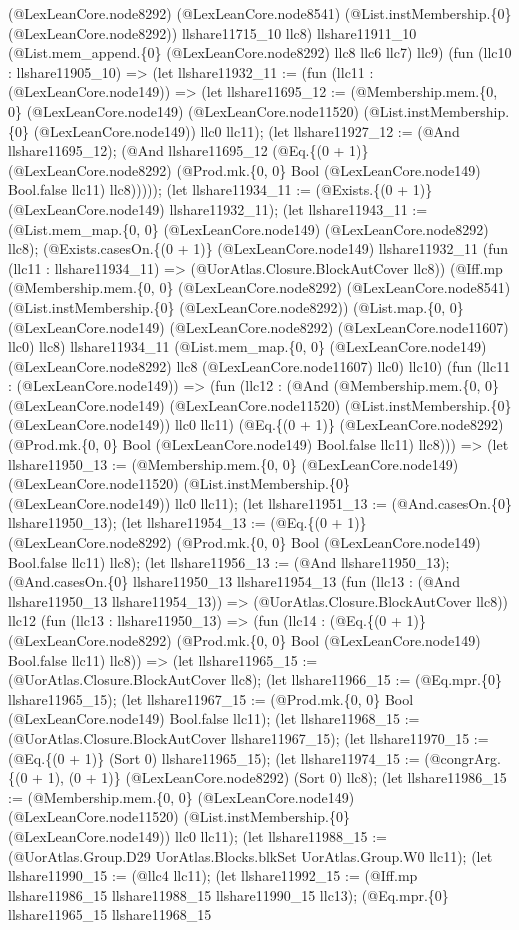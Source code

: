 \documentclass[11pt]{article}
\begin{document}
(@LexLeanCore.node8292) (@LexLeanCore.node8541) (@List.instMembership.\{0\} (@LexLeanCore.node8292)) llshare11715\_10 llc8) llshare11911\_10 (@List.mem\_append.\{0\} (@LexLeanCore.node8292) llc8 llc6 llc7) llc9) (fun (llc10 : llshare11905\_10) => (let llshare11932\_11 := (fun (llc11 : (@LexLeanCore.node149)) => (let llshare11695\_12 := (@Membership.mem.\{0, 0\} (@LexLeanCore.node149) (@LexLeanCore.node11520) (@List.instMembership.\{0\} (@LexLeanCore.node149)) llc0 llc11); (let llshare11927\_12 := (@And llshare11695\_12); (@And llshare11695\_12 (@Eq.\{(0 + 1)\} (@LexLeanCore.node8292) (@Prod.mk.\{0, 0\} Bool (@LexLeanCore.node149) Bool.false llc11) llc8))))); (let llshare11934\_11 := (@Exists.\{(0 + 1)\} (@LexLeanCore.node149) llshare11932\_11); (let llshare11943\_11 := (@List.mem\_map.\{0, 0\} (@LexLeanCore.node149) (@LexLeanCore.node8292) llc8); (@Exists.casesOn.\{(0 + 1)\} (@LexLeanCore.node149) llshare11932\_11 (fun (llc11 : llshare11934\_11) => (@UorAtlas.Closure.BlockAutCover llc8)) (@Iff.mp (@Membership.mem.\{0, 0\} (@LexLeanCore.node8292) (@LexLeanCore.node8541) (@List.instMembership.\{0\} (@LexLeanCore.node8292)) (@List.map.\{0, 0\} (@LexLeanCore.node149) (@LexLeanCore.node8292) (@LexLeanCore.node11607) llc0) llc8) llshare11934\_11 (@List.mem\_map.\{0, 0\} (@LexLeanCore.node149) (@LexLeanCore.node8292) llc8 (@LexLeanCore.node11607) llc0) llc10) (fun (llc11 : (@LexLeanCore.node149)) => (fun (llc12 : (@And (@Membership.mem.\{0, 0\} (@LexLeanCore.node149) (@LexLeanCore.node11520) (@List.instMembership.\{0\} (@LexLeanCore.node149)) llc0 llc11) (@Eq.\{(0 + 1)\} (@LexLeanCore.node8292) (@Prod.mk.\{0, 0\} Bool (@LexLeanCore.node149) Bool.false llc11) llc8))) => (let llshare11950\_13 := (@Membership.mem.\{0, 0\} (@LexLeanCore.node149) (@LexLeanCore.node11520) (@List.instMembership.\{0\} (@LexLeanCore.node149)) llc0 llc11); (let llshare11951\_13 := (@And.casesOn.\{0\} llshare11950\_13); (let llshare11954\_13 := (@Eq.\{(0 + 1)\} (@LexLeanCore.node8292) (@Prod.mk.\{0, 0\} Bool (@LexLeanCore.node149) Bool.false llc11) llc8); (let llshare11956\_13 := (@And llshare11950\_13); (@And.casesOn.\{0\} llshare11950\_13 llshare11954\_13 (fun (llc13 : (@And llshare11950\_13 llshare11954\_13)) => (@UorAtlas.Closure.BlockAutCover llc8)) llc12 (fun (llc13 : llshare11950\_13) => (fun (llc14 : (@Eq.\{(0 + 1)\} (@LexLeanCore.node8292) (@Prod.mk.\{0, 0\} Bool (@LexLeanCore.node149) Bool.false llc11) llc8)) => (let llshare11965\_15 := (@UorAtlas.Closure.BlockAutCover llc8); (let llshare11966\_15 := (@Eq.mpr.\{0\} llshare11965\_15); (let llshare11967\_15 := (@Prod.mk.\{0, 0\} Bool (@LexLeanCore.node149) Bool.false llc11); (let llshare11968\_15 := (@UorAtlas.Closure.BlockAutCover llshare11967\_15); (let llshare11970\_15 := (@Eq.\{(0 + 1)\} (Sort 0) llshare11965\_15); (let llshare11974\_15 := (@congrArg.\{(0 + 1), (0 + 1)\} (@LexLeanCore.node8292) (Sort 0) llc8); (let llshare11986\_15 := (@Membership.mem.\{0, 0\} (@LexLeanCore.node149) (@LexLeanCore.node11520) (@List.instMembership.\{0\} (@LexLeanCore.node149)) llc0 llc11); (let llshare11988\_15 := (@UorAtlas.Group.D29 UorAtlas.Blocks.blkSet UorAtlas.Group.W0 llc11); (let llshare11990\_15 := (@llc4 llc11); (let llshare11992\_15 := (@Iff.mp llshare11986\_15 llshare11988\_15 llshare11990\_15 llc13); (@Eq.mpr.\{0\} llshare11965\_15 llshare11968\_15 
\end{document}
